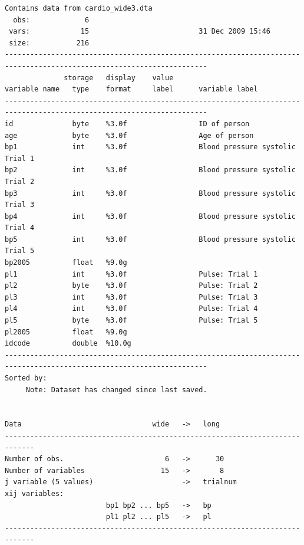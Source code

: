 \documentclass[
]{book}
\begin{document}
\begin{verbatim}
Contains data from cardio_wide3.dta
  obs:             6                          
 vars:            15                          31 Dec 2009 15:46
 size:           216                          
----------------------------------------------------------------------------------------------------------------------
              storage   display    value
variable name   type    format     label      variable label
----------------------------------------------------------------------------------------------------------------------
id              byte    %3.0f                 ID of person
age             byte    %3.0f                 Age of person
bp1             int     %3.0f                 Blood pressure systolic Trial 1
bp2             int     %3.0f                 Blood pressure systolic Trial 2
bp3             int     %3.0f                 Blood pressure systolic Trial 3
bp4             int     %3.0f                 Blood pressure systolic Trial 4
bp5             int     %3.0f                 Blood pressure systolic Trial 5
bp2005          float   %9.0g                 
pl1             int     %3.0f                 Pulse: Trial 1
pl2             byte    %3.0f                 Pulse: Trial 2
pl3             int     %3.0f                 Pulse: Trial 3
pl4             int     %3.0f                 Pulse: Trial 4
pl5             byte    %3.0f                 Pulse: Trial 5
pl2005          float   %9.0g                 
idcode          double  %10.0g                
----------------------------------------------------------------------------------------------------------------------
Sorted by: 
     Note: Dataset has changed since last saved.


Data                               wide   ->   long
-----------------------------------------------------------------------------
Number of obs.                        6   ->      30
Number of variables                  15   ->       8
j variable (5 values)                     ->   trialnum
xij variables:
                        bp1 bp2 ... bp5   ->   bp
                        pl1 pl2 ... pl5   ->   pl
-----------------------------------------------------------------------------



\end{verbatim}
\end{document}
